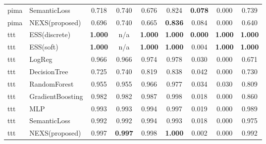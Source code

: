 \begin{table}[t]
{\begin{tabular}{llccccccc}
pima & SemanticLoss & 0.718 & 0.740 & 0.676 & 0.824 & \textbf{0.078} & 0.000 & 0.739 \\
pima & NEXS(proposed) & 0.696 & 0.740 & 0.665 & \textbf{0.836} & 0.084 & 0.000 & 0.640 \\
\midrule
ttt & ESS(discrete) & \textbf{1.000} & n/a & \textbf{1.000} & \textbf{1.000} & \textbf{0.000} & \textbf{1.000} & \textbf{1.000} \\
ttt & ESS(soft) & \textbf{1.000} & n/a & \textbf{1.000} & \textbf{1.000} & 0.004 & \textbf{1.000} & \textbf{1.000} \\
ttt & LogReg & 0.966 & 0.966 & 0.974 & 0.978 & 0.030 & 0.000 & 0.671 \\
ttt & DecisionTree & 0.725 & 0.740 & 0.819 & 0.838 & 0.042 & 0.000 & 0.730 \\
ttt & RandomForest & 0.955 & 0.955 & 0.966 & 0.977 & 0.034 & 0.030 & 0.809 \\
ttt & GradientBoosting & 0.982 & 0.982 & 0.987 & 0.998 & 0.018 & 0.000 & 0.860 \\
ttt & MLP & 0.993 & 0.993 & 0.994 & 0.997 & 0.019 & 0.000 & 0.989 \\
ttt & SemanticLoss & 0.992 & 0.992 & 0.994 & 0.993 & 0.018 & 0.000 & 0.975 \\
ttt & NEXS(proposed) & 0.997 & \textbf{0.997} & 0.998 & \textbf{1.000} & 0.002 & 0.000 & 0.992 \\
\bottomrule
\end{tabular}}
\end{table}